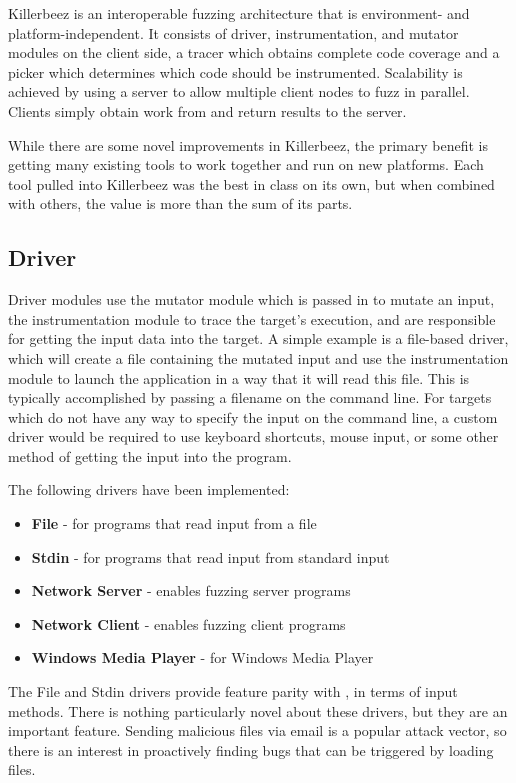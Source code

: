 Killerbeez is an interoperable fuzzing architecture that is
environment- and platform-independent. It consists of driver, instrumentation,
and mutator modules on the client side, a tracer which obtains complete code
coverage and a picker which determines which code should be instrumented.
Scalability is achieved by using a \BOINC{} server to allow multiple client
nodes to fuzz in parallel.  Clients simply obtain work from and return results
to the server.

While there are some novel improvements in Killerbeez,
the primary benefit is getting many existing tools to work
together and run on new platforms.  Each tool pulled into Killerbeez was the best in class on its own, but
when combined with others, the value is more than the sum of its parts.

\subsection{Driver} \label{Driver}
Driver modules use the mutator module which is passed in to mutate an input,
the instrumentation module to trace the target's execution, and are responsible
for getting the input data into the target.  A simple example is a
file-based driver, which will create a file containing the mutated input and
use the instrumentation module to launch the application in a way that it will
read this file.  This is typically accomplished by passing a filename on the
command line.  For targets which do not have any way to specify the input
on the command line, a custom driver would be required to use keyboard
shortcuts, mouse input, or some other method of getting the input into the
program.

The following drivers have been implemented:
\begin{itemize}[noitemsep]
\item \textbf{File} - for programs that read input from a file
\item \textbf{Stdin} - for programs that read input from standard input
\item \textbf{Network Server} - enables fuzzing server programs
\item \textbf{Network Client} - enables fuzzing client programs
\item \textbf{Windows Media Player} - for Windows Media Player
\end{itemize}

The File and Stdin drivers provide feature parity with \AFL{}, in terms of input
methods. There is nothing particularly novel about these drivers, but they are
an important feature.  Sending malicious files via email is a popular attack
vector, so there is an interest in proactively finding bugs that can be triggered by loading files.

